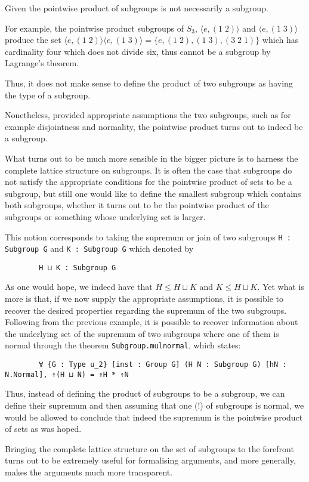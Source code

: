 \begin{remark}
    Given the pointwise product of subgroups is not necessarily a subgroup. 

    For example, the pointwise product subgroups of $S_3$, $\langle e, (1\;2) \rangle$ and $\langle e, (1\;3) \rangle$ produce the set 
    $\langle e, (1\;2) \rangle \langle e, (1\;3) \rangle =\{e, (1\;2), (1\;3), (3\;2\;1)\}$ which has cardinality four which does not divide six,
    thus cannot be a subgroup by Lagrange's theorem.

    Thus, it does not make sense to define the product of two subgroups as having the type of a subgroup.

    Nonetheless, provided appropriate assumptions the two subgroups, such as for example disjointness and normality, the pointwise product turns out to indeed be a subgroup.
    
    What turns out to be much more sensible in the bigger picture is to harness the complete lattice structure on subgroups. It is often the case that
    subgroups do not satisfy the appropriate conditions for the pointwise product of sets to be a subgroup, but still one would like to define the smallest subgroup which contains both subgroups,
    whether it turns out to be the pointwise product of the subgroups or something whose underlying set is larger.

    This notion corresponds to taking the supremum or join of two subgroups \texttt{H : Subgroup G} and \texttt{K : Subgroup G} which denoted by 

    \begin{verbatim}
        H ⊔ K : Subgroup G
    \end{verbatim}

    As one would hope, we indeed have that $H \le H \sqcup K$ and $K \le H \sqcup K$.
    Yet what is more is that, if we now supply the appropriate assumptions, it is
    possible to recover the desired properties regarding the supremum of the two subgroups. Following from the previous example,
    it is possible to recover information about the underlying set of the supremum of two subgroups where one of them is normal 
    through the theorem \texttt{Subgroup.mul\textunderscore normal}, which states:
    
    \begin{verbatim}
        ∀ {G : Type u_2} [inst : Group G] (H N : Subgroup G) [hN : N.Normal], ↑(H ⊔ N) = ↑H * ↑N
    \end{verbatim}
    
    Thus, instead of defining the product of subgroups to be a subgroup, we can define their supremum and then
    assuming that one (!) of subgroups is normal, we would be allowed to conclude that indeed the supremum
    is the pointwise product of sets as was hoped.
    
    Bringing the complete lattice structure on the set of subgroups to the forefront turns out to be extremely useful for formalising arguments,
    and more generally, makes the arguments much more transparent.
\end{remark}

